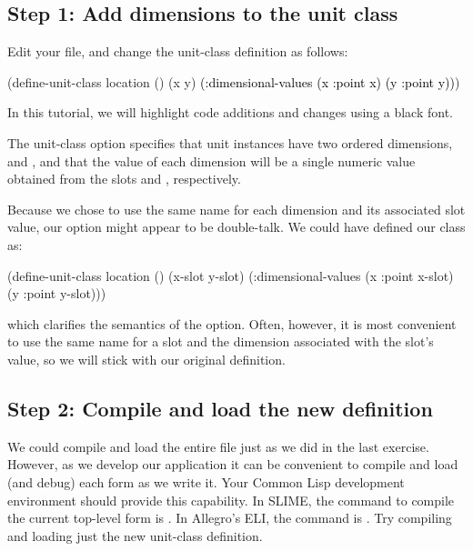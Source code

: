\documentclass[10pt,twoside,english,pdftex]{article}
\begin{document}
\subsection*{Step 1: Add dimensions to the  unit class}

Edit your  file, and change the
 unit-class definition as follows:
%
\W\supp
\begin{example}
\textcolor{darkergray}{%
  (define-unit-class location ()
    (x y)
    \textcolor{black}{(:dimensional-values
      (x :point x)
      (y :point y))})}
\end{example}
%
In this tutorial, we will highlight code additions and changes using a
black font.

The  unit-class option specifies that
 unit instances have two ordered dimensions, 
and , and that the value of each dimension will be a single numeric
value obtained from the slots  and , respectively.

Because we chose to use the same name for each dimension and its associated
slot value, our  option might appear to be
double-talk.  We could have defined our class as:
%
\W\supp
\begin{example}
\textcolor{darkergray}{%
  (define-unit-class location ()
    (x-slot y-slot)
    (:dimensional-values
      (x :point x-slot)
      (y :point y-slot)))}
\end{example}
%
which clarifies the semantics of the 
option.  Often, however, it is most convenient to use the same name
for a slot and the dimension associated with the slot's value, so we
will stick with our original definition.

\subsection*{Step 2: Compile and load the new definition}

We could compile and load the entire  file
just as we did in the last exercise.  However, as we develop our application
it can be convenient to compile and load (and debug) each form as we write it.
Your Common Lisp development environment should provide this capability.  In
SLIME, the command to compile the current top-level form is .  In Allegro's ELI, the command is .  Try
compiling and loading just the new  unit-class
definition.
\end{document}

